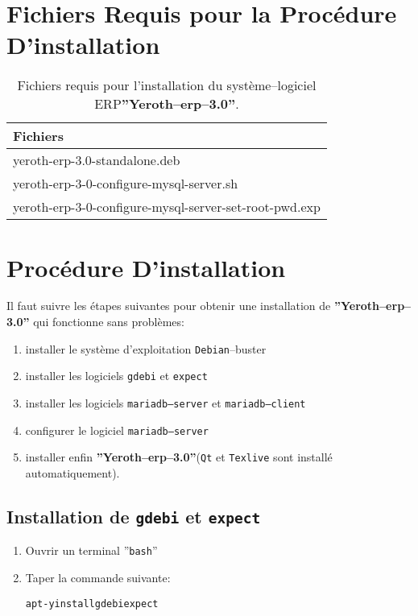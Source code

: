 \documentclass[a4paper, 10pt]{article}
\newcommand{\yerotherptroiszero}{\textbf{''Yeroth--erp--3.0''}\xspace}
\newcommand{\texlive}{\texttt{Texlive}\xspace}
\newcommand{\gdebi}{\texttt{gdebi}\xspace}
\newcommand{\expect}{\texttt{expect}\xspace}
\newcommand{\debian}{\texttt{Debian}\xspace}
\newcommand{\bash}{\texttt{bash}\xspace}
\newcommand{\qt}{\texttt{Qt}\xspace}
\newcommand{\mariadbserver}{\texttt{mariadb--server}\xspace}
\newcommand{\mariadbclient}{\texttt{mariadb--client}\xspace}
\newcommand{\erp}{syst\`eme--logiciel ERP\xspace}
\newcommand{\rootcommand}[1]{\textcolor{purplish}{#1\xspace}}
\begin{document}
\section{Fichiers Requis pour la Proc\'edure D'installation}

\begin{table}[!htbp]
\centering
\begin{tabular}{|l|} \hline
\textbf{Fichiers}		\\ \hline
yeroth-erp-3.0-standalone.deb							\\ \hline
yeroth-erp-3-0-configure-mysql-server.sh				\\ \hline	
yeroth-erp-3-0-configure-mysql-server-set-root-pwd.exp	\\ \hline	
\end{tabular}
\caption{Fichiers requis pour l'installation du
	 \erp \yerotherptroiszero.}
\label{tab:prerequisite-software}
\end{table}

\section{Proc\'edure D'installation}

Il faut suivre les \'etapes suivantes pour obtenir
une installation de \yerotherptroiszero qui fonctionne
sans probl\`emes:

\begin{enumerate} [1)]
	\item installer le syst\`eme d'exploitation \debian--buster
	\item installer les logiciels \gdebi et \expect
	\item installer les logiciels \mariadbserver et \mariadbclient
	\item configurer le logiciel \mariadbserver
	\item installer enfin \yerotherptroiszero (\qt et \texlive sont install\'e automatiquement).
\end{enumerate}

\subsection{Installation de \gdebi et \expect}

\begin{enumerate}[1)]
	\item Ouvrir un terminal ''\bash''
	\item Taper la commande suivante:
		\begin{alltt}
			\rootcommand{apt -y install gdebi expect}
		\end{alltt}
\end{enumerate} 
\end{document}
